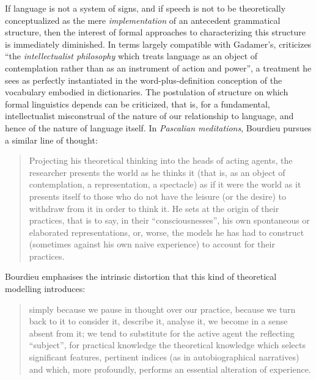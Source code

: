 \documentclass[output=paper]{langscibook}
\begin{document}
\noindent If language is not a system of signs, and if speech is not to be theoretically conceptualized as the mere \emph{implementation} of an antecedent grammatical structure, then the interest of formal approaches to characterizing this structure is immediately diminished. In terms largely compatible with Gadamer's, \citet[37, italics original]{Bourdieu1991} criticizes ``the \emph{intellectualist philosophy} which treats language as an object of contemplation rather than as an instrument of action and power'', a treatment he sees as perfectly instantiated in the word-plus-definition conception of the vocabulary embodied in dictionaries. The postulation of structure on which formal linguistics depends can be criticized, that is, for a fundamental, intellectualist misconstrual of the nature of our relationship to language, and hence of the nature of language itself. In \emph{Pascalian meditations}, Bourdieu pursues a similar line of thought:

\begin{quotation}
Projecting his theoretical thinking into the heads of acting agents, the researcher presents the world as he thinks it (that is, as an object of contemplation, a representation, a spectacle) as if it were the world as it presents itself to those who do not have the leisure (or the desire) to withdraw from it in order to think it. He sets at the origin of their practices, that is to say, in their ``consciousnesses'', his own spontaneous or elaborated representations, or, worse, the models he has had to construct (sometimes against his own naive experience) to account for their practices. \citep[51]{Bourdieu20031997}
\end{quotation}

\noindent Bourdieu emphasises the intrinsic distortion that this kind of theoretical modelling introduces:

\begin{quotation}
simply because we pause in thought over our practice, because we turn back to it to consider it, describe it, analyse it, we become in a sense absent from it; we tend to substitute for the active agent the reflecting ``subject'', for practical knowledge the theoretical knowledge which selects significant features, pertinent indices (as in autobiographical narratives) and which, more profoundly, performs an essential alteration of experience. \citep[51--52]{Bourdieu20031997}
\end{quotation}
\end{document}
